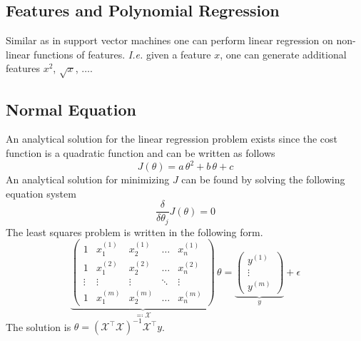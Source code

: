 \documentclass[a4paper,twoside,10pt]{article}
\begin{document}
\subsection{Features and Polynomial Regression}\label{cha:polyregression}
Similar as in support vector machines one can perform linear regression on non-linear functions of features.
\emph{I.e.} given a feature $x$, one can generate additional features $x^2$, $\sqrt x$, $\ldots$.

\subsection{Normal Equation}\label{cha:normal}
An analytical solution for the linear regression problem exists since the cost function is a quadratic function and
can be written as follows
\begin{equation*}
  J(\theta)=a\,\theta^2+b\,\theta+c
\end{equation*}
An analytical solution for minimizing $J$ can be found by solving the following equation system
\begin{equation*}
  \frac{\delta}{\delta\theta_j}J(\theta)=0
\end{equation*}
The least squares problem is written in the following form.
\begin{equation*}
  \underbrace{\begin{pmatrix}
1&x^{(1)}_1&x^{(1)}_2&\hdots&x^{(1)}_n\\
1&x^{(2)}_1&x^{(2)}_2&\hdots&x^{(2)}_n\\
\vdots&\vdots&\vdots&\ddots&\vdots\\
1&x^{(m)}_1&x^{(m)}_2&\hdots&x^{(m)}_n
  \end{pmatrix}}_{\eqqcolon\mathcal{X}}\,\theta=
\underbrace{\begin{pmatrix}y^{(1)}\\\vdots\\y^{(m)}\end{pmatrix}}_{y}+\epsilon
\end{equation*}
The solution is $\theta=(\mathcal{X}^\top\mathcal{X})^{-1}\mathcal{X}^\top y$.
\end{document}
